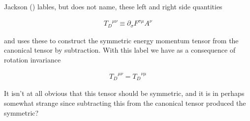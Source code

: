 Jackson (\cite{jackson1975cew}) lables, but does not name, these left and right side quantities

\begin{align}\label{eqn:rotationCurrents:goo13}
{T_D}^{\mu\nu} \equiv \partial_\sigma F^{\sigma\mu} A^\nu
\end{align}

and uses these to construct the symmetric energy momentum tensor from the canonical tensor by subtraction.  With this label we have as a consequence of rotation invariance

\begin{align}\label{eqn:rotationCurrents:goo14}
{T_D}^{\mu\nu} = {T_D}^{\nu\mu}
\end{align}

It isn't at all obvious that this tensor should be symmetric, and it is in perhaps somewhat strange since subtracting this from the canonical tensor produced the symmetric?

\EndArticle
